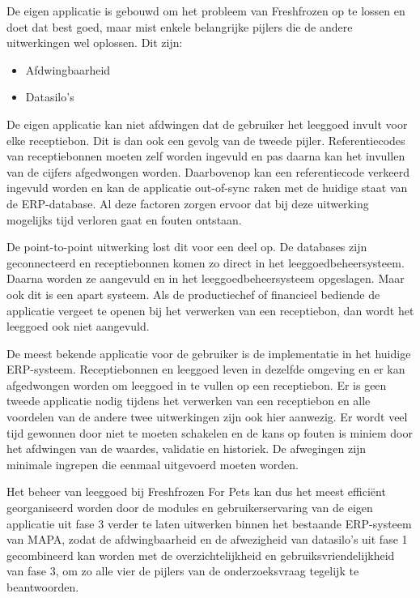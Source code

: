 De eigen applicatie is gebouwd om het probleem van Freshfrozen op te lossen en doet dat best goed, maar mist enkele belangrijke pijlers die de andere uitwerkingen wel oplossen. Dit zijn:

\begin{itemize}
    \item Afdwingbaarheid
    \item Datasilo's
\end{itemize}

De eigen applicatie kan niet afdwingen dat de gebruiker het leeggoed invult voor elke receptiebon. Dit is dan ook een gevolg van de tweede pijler. Referentiecodes van receptiebonnen moeten zelf worden ingevuld en pas daarna kan het invullen van de cijfers afgedwongen worden. Daarbovenop kan een referentiecode verkeerd ingevuld worden en kan de applicatie out-of-sync raken met de huidige staat van de ERP-database. Al deze factoren zorgen ervoor dat bij deze uitwerking mogelijks tijd verloren gaat en fouten ontstaan.

De point-to-point uitwerking lost dit voor een deel op. De databases zijn geconnecteerd en receptiebonnen komen zo direct in het leeggoedbeheersysteem. Daarna worden ze aangevuld en in het leeggoedbeheersysteem opgeslagen. Maar ook dit is een apart systeem. Als de productiechef of financieel bediende de applicatie vergeet te openen bij het verwerken van een receptiebon, dan wordt het leeggoed ook niet aangevuld.

De meest bekende applicatie voor de gebruiker is de implementatie in het huidige ERP-systeem. Receptiebonnen en leeggoed leven in dezelfde omgeving en er kan afgedwongen worden om leeggoed in te vullen op een receptiebon. Er is geen tweede applicatie nodig tijdens het verwerken van een receptiebon en alle voordelen van de andere twee uitwerkingen zijn ook hier aanwezig. Er wordt veel tijd gewonnen door niet te moeten schakelen en de kans op fouten is miniem door het afdwingen van de waardes, validatie en historiek. De afwegingen zijn minimale ingrepen die eenmaal uitgevoerd moeten worden.

Het beheer van leeggoed bij Freshfrozen For Pets kan dus het meest efficiënt georganiseerd worden door de modules en gebruikerservaring van de eigen applicatie uit fase 3 verder te laten uitwerken binnen het bestaande ERP-systeem van MAPA, zodat de afdwingbaarheid en de afwezigheid van datasilo's uit fase 1 gecombineerd kan worden met de overzichtelijkheid en gebruiksvriendelijkheid van fase 3, om zo alle vier de pijlers van de onderzoeksvraag tegelijk te beantwoorden.

